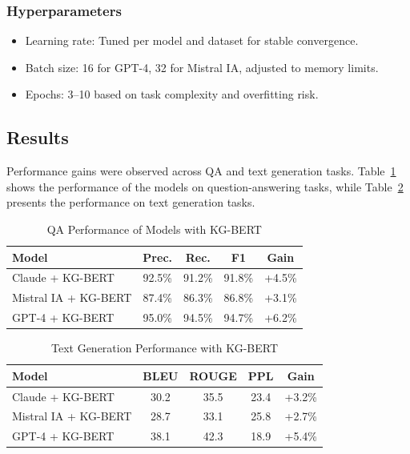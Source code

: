 \documentclass[conference]{IEEEtran}
\begin{document}
\subsubsection{Hyperparameters} 
\begin{itemize}
    \item Learning rate: Tuned per model and dataset for stable convergence.
    \item Batch size: 16 for GPT-4, 32 for Mistral IA, adjusted to memory limits.
    \item Epochs: 3–10 based on task complexity and overfitting risk.
\end{itemize}

\subsection{Results}
Performance gains were observed across QA and text generation tasks. Table~\ref{table:tab2} shows the performance of the models on question-answering tasks, while Table~\ref{table:tab3} presents the performance on text generation tasks.


\begin{table}[h!]
\caption{QA Performance of Models with KG-BERT}
\centering
\small
\setlength{\tabcolsep}{5pt}
\begin{tabular}{|l|c|c|c|c|}
\hline
\textbf{Model} & \textbf{Prec.} & \textbf{Rec.} & \textbf{F1} & \textbf{Gain} \\ 
\hline
Claude + KG-BERT & 92.5\% & 91.2\% & 91.8\% & +4.5\% \\
Mistral IA + KG-BERT & 87.4\% & 86.3\% & 86.8\% & +3.1\% \\
GPT-4 + KG-BERT & 95.0\% & 94.5\% & 94.7\% & +6.2\% \\
\hline
\end{tabular}
\label{table:tab2}
\end{table}

\vspace{-4mm}

\begin{table}[h!]
\caption{Text Generation Performance with KG-BERT}
\centering
\small
\setlength{\tabcolsep}{5pt}
\begin{tabular}{|l|c|c|c|c|}
\hline
\textbf{Model} & \textbf{BLEU} & \textbf{ROUGE} & \textbf{PPL} & \textbf{Gain} \\ 
\hline
Claude + KG-BERT & 30.2 & 35.5 & 23.4 & +3.2\% \\
Mistral IA + KG-BERT & 28.7 & 33.1 & 25.8 & +2.7\% \\
GPT-4 + KG-BERT & 38.1 & 42.3 & 18.9 & +5.4\% \\
\hline
\end{tabular}
\label{table:tab3}
\end{table}
\end{document}
